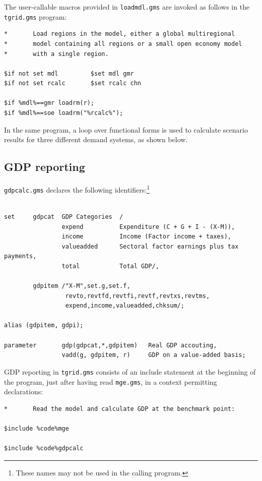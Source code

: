 The user-callable macros provided in \texttt{loadmdl.gms} are invoked
as follows in the \texttt{tgrid.gms} program:

\begin{Verbatim}
*       Load regions in the model, either a global multiregional
*       model containing all regions or a small open economy model
*       with a single region.

$if not set mdl         $set mdl gmr
$if not set rcalc       $set rcalc chn

$if %mdl%==gmr loadrm(r);
$if %mdl%==soe loadrm("%rcalc%");
\end{Verbatim}

In the same program, a loop over functional forms is used to calculate
scenario results for three different demand systems, as shown below.

\subsection*{GDP reporting}

\texttt{gdpcalc.gms} declares the following
identifiers:\footnote{These names may not be used in the calling
program.}

\begin{Verbatim}

set     gdpcat  GDP Categories  /
                expend          Expenditure (C + G + I - (X-M)),
                income          Income (Factor income + taxes),
                valueadded      Sectoral factor earnings plus tax payments,
                total           Total GDP/,

        gdpitem /"X-M",set.g,set.f,
                 revto,revtfd,revtfi,revtf,revtxs,revtms,
                 expend,income,valueadded,chksum/;

alias (gdpitem, gdpi);

parameter       gdp(gdpcat,*,gdpitem)   Real GDP accouting,
                vadd(g, gdpitem, r)     GDP on a value-added basis;
\end{Verbatim}

GDP reporting in \texttt{tgrid.gms} consists of an include statement
at the beginning of the program, just after having read
\texttt{mge.gms}, in a context permitting declarations:

\begin{Verbatim}
*       Read the model and calculate GDP at the benchmark point:

$include %code%mge

$include %code%gdpcalc
\end{Verbatim}

